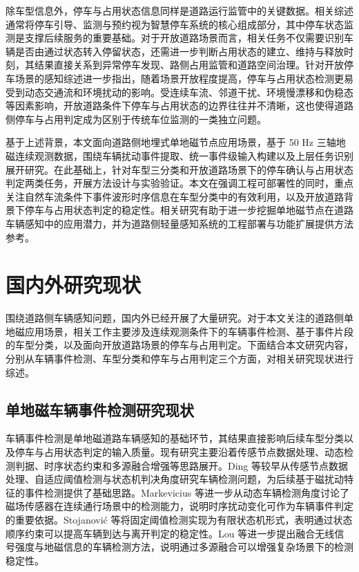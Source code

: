 \documentclass{xdupgthesis}
\begin{document}
除车型信息外，停车与占用状态信息同样是道路运行监管中的关键数据。相关综述通常将停车引导、监测与预约视为智慧停车系统的核心组成部分，其中停车状态监测是支撑后续服务的重要基础\cite{kotb2017smartparking}。对于开放道路场景而言，相关任务不仅需要识别车辆是否由通过状态转入停留状态，还需进一步判断占用状态的建立、维持与释放时刻，其结果直接关系到异常停车发现、路侧占用监管和道路空间治理。针对开放停车场景的感知综述进一步指出，随着场景开放程度提高，停车与占用状态检测更易受到动态交通流和环境扰动的影响\cite{R52}。受连续车流、邻道干扰、环境慢漂移和伪稳态等因素影响，开放道路条件下停车与占用状态的边界往往并不清晰，这也使得道路侧停车与占用判定成为区别于传统车位监测的一类独立问题。

基于上述背景，本文面向道路侧地埋式单地磁节点应用场景，基于 50 Hz 三轴地磁连续观测数据，围绕车辆扰动事件提取、统一事件级输入构建以及上层任务识别展开研究。在此基础上，针对车型三分类和开放道路场景下的停车确认与占用状态判定两类任务，开展方法设计与实验验证。本文在强调工程可部署性的同时，重点关注自然车流条件下事件波形时序信息在车型分类中的有效利用，以及开放道路背景下停车与占用状态判定的稳定性。相关研究有助于进一步挖掘单地磁节点在道路车辆感知中的应用潜力，并为道路侧轻量感知系统的工程部署与功能扩展提供方法参考。


\section{国内外研究现状}
\label{sec:related_work}

围绕道路侧车辆感知问题，国内外已经开展了大量研究。对于本文关注的道路侧单地磁应用场景，相关工作主要涉及连续观测条件下的车辆事件检测、基于事件片段的车型分类，以及面向开放道路场景的停车与占用判定。下面结合本文研究内容，分别从车辆事件检测、车型分类和停车与占用判定三个方面，对相关研究现状进行综述。

\subsection{单地磁车辆事件检测研究现状}
\label{sec:related_sensor_detection}

车辆事件检测是单地磁道路车辆感知的基础环节，其结果直接影响后续车型分类以及停车与占用状态判定的输入质量。现有研究主要沿着传感节点数据处理、动态检测判据、时序状态约束和多源融合增强等思路展开。Ding 等\cite{ch2_ding2004signal}较早从传感节点数据处理、自适应阈值检测与状态机判决角度研究车辆检测问题，为后续基于磁扰动特征的事件检测提供了基础思路。Markevicius 等\cite{R12}进一步从动态车辆检测角度讨论了磁场传感器在连续通行场景中的检测能力，说明时序扰动变化可作为车辆事件判定的重要依据。Stojanovi\'{c} 等\cite{stojanovic2025fsm}将固定阈值检测实现为有限状态机形式，表明通过状态顺序约束可以提高车辆到达与离开判定的稳定性。Lou 等\cite{R13}进一步提出融合无线信号强度与地磁信息的车辆检测方法，说明通过多源融合可以增强复杂场景下的检测稳定性。
\end{document}
